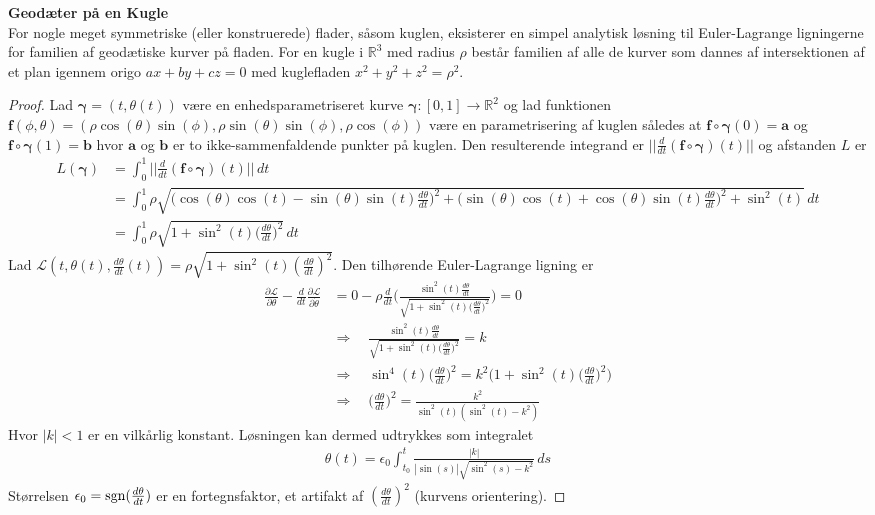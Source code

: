
\begin{thm} {\bf Geodæter på en Kugle}\\
\noindent For nogle meget symmetriske (eller konstruerede) flader, såsom kuglen, eksisterer en simpel analytisk løsning til Euler-Lagrange ligningerne for familien af geodætiske kurver på fladen. For en kugle i $\mathbb{R}^3$ med radius $\rho$ består familien af alle de kurver som dannes af intersektionen af et plan igennem origo $ax+by+cz=0$ med kuglefladen $x^2 + y^2 +z^2 =\rho^2$. 
\end{thm}

\begin{proof}
Lad ${\boldsymbol \gamma} =(t, \theta(t)) $ være en enhedsparametriseret kurve ${\boldsymbol \gamma} : [0,1] \rightarrow \mathbb{R}^2$ og lad funktionen $\mathbf{f}(\phi,\theta) = (\rho\cos(\theta)\sin(\phi), \rho\sin(\theta)\sin(\phi), \rho\cos(\phi))$ være en parametrisering af kuglen således at $\mathbf{f} \circ {\boldsymbol \gamma}(0)=\mathbf{a}$ og $\mathbf{f} \circ {\boldsymbol \gamma}(1)=\mathbf{b}$ hvor $\mathbf{a}$ og $\mathbf{b}$ er to ikke-sammenfaldende punkter på kuglen. Den resulterende integrand er $|| \frac{d}{dt}(\mathbf{f} \circ {\boldsymbol \gamma})(t) ||$ og afstanden $L$ er
\begin{align*}
L({\boldsymbol \gamma}) &= \int_0^1 ||\frac{d}{dt}(\mathbf{f} \circ {\boldsymbol \gamma})(t) || \, dt \\
&= \int_0^1 \rho\sqrt{\big( \cos(\theta)\cos(t)-\sin(\theta)\sin(t) \frac{d\theta}{dt} \big)^2 + \big(\sin(\theta)\cos(t)+\cos(\theta)\sin(t) \frac{d\theta}{dt} \big)^2 + \sin^2(t)} \, dt\\
&= \int_0^1 \rho\sqrt{1+\sin^2(t) \big(\frac{d\theta}{dt} \big)^2} \, dt
\end{align*}
Lad $\mathcal{L}(t,\theta(t),\frac{d\theta}{dt}(t))= \rho\sqrt{1+\sin^2(t) (\frac{d\theta}{dt})^2}$. Den tilhørende Euler-Lagrange ligning er
\begin{align*}
\frac{\partial \mathcal{L}}{\partial \theta} - \frac{d}{dt} \frac{\partial \mathcal{L}}{\partial \dot{\theta}} &= 0-\rho \frac{d}{dt}\Big( \frac{\sin^2(t)\frac{d\theta}{dt}}{\sqrt{1+\sin^2(t) \big(\frac{d\theta}{dt} \big)^2}} \Big) = 0 \\
&\Rightarrow \quad \frac{\sin^2(t)\frac{d\theta}{dt}}{\sqrt{1+\sin^2(t) \big(\frac{d\theta}{dt} \big)^2}} = k \\
&\Rightarrow \quad
\sin^4(t)\big(\frac{d\theta}{dt} \big)^2 = k^2 \Big( 1+\sin^2(t) \big(\frac{d\theta}{dt} \big)^2 \Big) \\
&\Rightarrow \quad
\big(\frac{d\theta}{dt} \big)^2 = \frac{k^2}{\sin^2(t)(\sin^2(t)-k^2)}
\end{align*}
Hvor $|k|<1$ er en vilkårlig konstant. Løsningen kan dermed udtrykkes som integralet
\begin{align*}
\theta(t) = \epsilon_0 \int_{t_0}^t \frac{|k|}{|\sin(s)|\sqrt{\sin^2(s)-k^2}} \, ds
\end{align*}
Størrelsen $\epsilon_0 = \textnormal{sgn}(\frac{d\theta}{dt}) $ er en fortegnsfaktor, et artifakt af $(\frac{d\theta}{dt})^2$ (kurvens orientering).



\end{proof}

